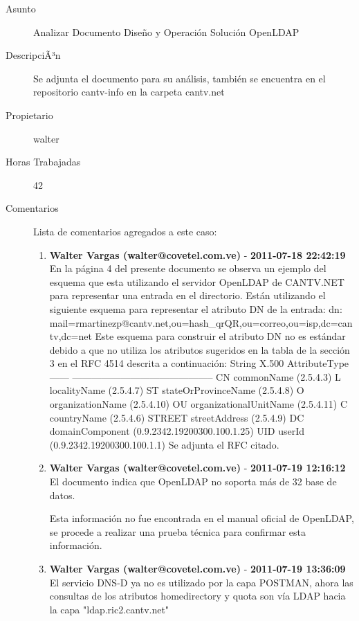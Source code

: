 \begin{description}

\item[Asunto] Analizar Documento Diseño y Operación Solución OpenLDAP\item[DescripciÃ³n] Se adjunta el documento para su análisis, también se encuentra en el
repositorio cantv-info en la carpeta cantv.net\item[Propietario] walter\item[Horas Trabajadas] 42

\item[Comentarios] Lista de comentarios agregados a este caso:  
\begin{enumerate}
        \item {\bfseries Walter Vargas (walter@covetel.com.ve)  } - {\bfseries 2011-07-18 22:42:19} \\ En la página 4 del presente documento se observa un ejemplo del esquema que
esta utilizando el servidor OpenLDAP de CANTV.NET para representar una entrada
en el directorio. Están utilizando el siguiente esquema para representar el
atributo DN de la entrada: dn:
mail=rmartinezp@cantv.net,ou=hash_qrQR,ou=correo,ou=isp,dc=cantv,dc=net Este
esquema para construir el atributo DN no es estándar debido a que no utiliza
los atributos sugeridos en la tabla de la sección 3 en el RFC 4514 descrita a
continuación: String X.500 AttributeType ------
-------------------------------------------- CN commonName (2.5.4.3) L
localityName (2.5.4.7) ST stateOrProvinceName (2.5.4.8) O organizationName
(2.5.4.10) OU organizationalUnitName (2.5.4.11) C countryName (2.5.4.6) STREET
streetAddress (2.5.4.9) DC domainComponent (0.9.2342.19200300.100.1.25) UID
userId (0.9.2342.19200300.100.1.1) Se adjunta el RFC citado.        \item {\bfseries Walter Vargas (walter@covetel.com.ve)  } - {\bfseries 2011-07-19 12:16:12} \\ El documento indica que OpenLDAP no soporta más de 32 base de datos.

Esta información no fue encontrada en el manual oficial de OpenLDAP, se procede 
a realizar una prueba técnica para confirmar esta información. 

        \item {\bfseries Walter Vargas (walter@covetel.com.ve)  } - {\bfseries 2011-07-19 13:36:09} \\ El servicio DNS-D ya no es utilizado por la capa POSTMAN, 
ahora las consultas de los atributos homedirectory y quota 
son vía LDAP hacia la capa "ldap.ric2.cantv.net" 


\end{enumerate}
\end{description}
